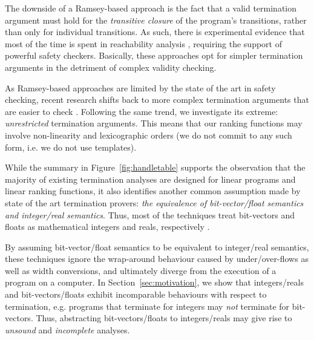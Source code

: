 \documentclass[preprint]{sigplanconf}
\theoremstyle{definition}
\begin{document}
The downside of a Ramsey-based approach is the fact that a valid termination argument must hold for the \emph{transitive closure}
of the program's transitions, rather than only for individual transitions. 
As such, there is experimental evidence that most of the time is spent in reachability analysis \cite{DBLP:conf/pldi/CookPR06}, 
requiring the support of powerful safety checkers.
Basically, these approaches opt for simpler termination arguments in the detriment of complex validity checking.


As Ramsey-based approaches are limited by the state of the art in safety checking, 
recent research shifts back to more complex termination arguments that are easier to check \cite{DBLP:conf/tacas/CookSZ13,DBLP:conf/cav/KroeningSTW10}.
%
%
Following the same trend, %
we investigate its extreme: \emph{unrestricted} termination arguments. 
This means that our ranking functions may involve non-linearity and lexicographic orders (we do not commit to any such form, i.e. we do not use templates).


While the summary  in Figure~\ref{fig:handletable} supports the observation that the majority of existing termination analyses are designed for
linear programs and linear ranking functions, it also identifies another common assumption made by state of the art termination provers: 
\emph{the equivalence of bit-vector/float semantics and integer/real semantics}. Thus, most of the techniques treat
bit-vectors and floats as mathematical integers and reals, respectively  \cite{DBLP:conf/pldi/CookPR06,DBLP:conf/popl/Ben-AmramG13,DBLP:conf/vmcai/P04,DBLP:conf/atva/HeizmannHLP13,DBLP:conf/vmcai/BradleyMS05,DBLP:conf/cav/KroeningSTW10}. 


By assuming bit-vector/float semantics to be equivalent to integer/real semantics, 
these techniques ignore the wrap-around behaviour caused by under/over-flows as well as width conversions, 
and ultimately diverge from the execution of a program on a computer.  
In Section~\ref{sec:motivation}, we show that integers/reals and bit-vectors/floats exhibit
incomparable behaviours with respect to termination, e.g.
programs that terminate for integers may \emph{not} terminate for bit-vectors.
Thus, abstracting bit-vectors/floats to integers/reals may give rise to 
{\em unsound} and {\em incomplete} analyses.
\end{document}
